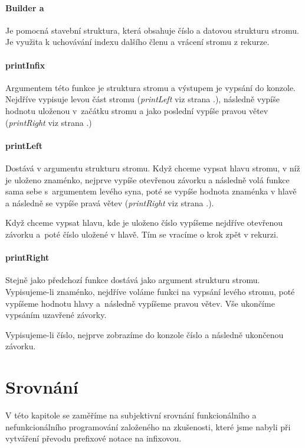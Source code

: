 \documentclass[12pt,a4paper]{report}
\begin{document}
\subsubsection{Builder a} \label{Builder}
Je pomocná stavební struktura, která obsahuje číslo a datovou strukturu stromu. Je využita k uchovávání indexu dalšího členu a vrácení stromu z rekurze.
\subsubsection{printInfix} \label{printInfix} 
Argumentem této funkce je struktura stromu a výstupem je vypsání do konzole. Nejdříve vypisuje levou část stromu (\textit{printLeft} viz strana \pageref{printLeft}.), následně vypíše hodnotu uloženou v~začátku stromu a jako poslední vypíše pravou větev (\textit{printRight} viz strana \pageref{printRight}.)

\subsubsection{printLeft} \label{printLeft}
Dostává v argumentu strukturu stromu. Když chceme vypsat hlavu stromu, v níž je uloženo znaménko, nejprve vypíše otevřenou závorku a následně volá funkce sama sebe s~argumentem levého syna, poté se vypíše hodnota znaménka v hlavě a následně se vypíše pravá větev (\textit{printRight} viz strana \pageref{printRight}.).

Když chceme vypsat hlavu, kde je uloženo číslo vypíšeme nejdříve otevřenou závorku a~poté číslo uložené v hlavě. Tím se vracíme o krok zpět v rekurzi.
\newpage
\subsubsection{printRight} \label{printRight}
Stejně jako předchozí funkce dostává jako argument strukturu stromu. Vypisujeme-li znaménko, nejdříve voláme funkci na vypsání levého stromu, poté vypíšeme hodnotu hlavy a~následně vypíšeme pravou větev. Vše ukončíme vypsáním uzavřené závorky.

Vypisujeme-li číslo, nejprve zobrazíme do konzole číslo a následně ukončenou závorku. 

\chapter{Srovnání}
V této kapitole se zaměříme na subjektivní srovnání funkcionálního a nefunkcionálního programování založeného na zkušenosti, které jsme nabyli při vytváření převodu prefixové notace na infixovou. 
\end{document}
